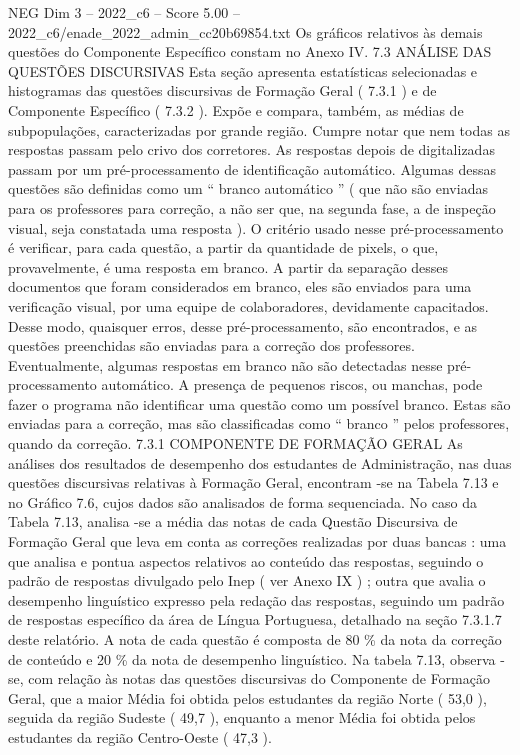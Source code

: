 \begin{textsample}{NEG Dim 3 – 2022\_c6 – Score 5.00 – 2022\_c6/enade\_2022\_admin\_cc20b69854.txt}
Os gráficos relativos às demais questões do Componente Específico constam no Anexo IV. 7.3 ANÁLISE DAS QUESTÕES DISCURSIVAS Esta seção apresenta estatísticas selecionadas e histogramas das questões discursivas de Formação Geral ( 7.3.1 ) e de Componente Específico ( 7.3.2 ).
Expõe e compara, também, as médias de subpopulações, caracterizadas por grande região.
Cumpre notar que nem todas as respostas passam pelo crivo dos corretores.
As respostas depois de digitalizadas passam por um pré-processamento de identificação automático.
Algumas dessas questões são definidas como um “ branco automático ” ( que não são enviadas para os professores para correção, a não ser que, na segunda fase, a de inspeção visual, seja constatada uma resposta ).
O critério usado nesse pré-processamento é verificar, para cada questão, a partir da quantidade de pixels, o que, provavelmente, é uma resposta em branco.
A partir da separação desses documentos que foram considerados em branco, eles são enviados para uma verificação visual, por uma equipe de colaboradores, devidamente capacitados.
Desse modo, quaisquer erros, desse pré-processamento, são encontrados, e as questões preenchidas são enviadas para a correção dos professores.
Eventualmente, algumas respostas em branco não são detectadas nesse pré-processamento automático.
A presença de pequenos riscos, ou manchas, pode fazer o programa não identificar uma questão como um possível branco.
Estas são enviadas para a correção, mas são classificadas como “ branco ” pelos professores, quando da correção. 7.3.1 COMPONENTE DE FORMAÇÃO GERAL As análises dos resultados de desempenho dos estudantes de Administração, nas duas questões discursivas relativas à Formação Geral, encontram -se na Tabela 7.13 e no Gráfico 7.6, cujos dados são analisados de forma sequenciada.
No caso da Tabela 7.13, analisa -se a média das notas de cada Questão Discursiva de Formação Geral que leva em conta as correções realizadas por duas bancas : uma que analisa e pontua aspectos relativos ao conteúdo das respostas, seguindo o padrão de respostas divulgado pelo Inep ( ver Anexo IX ) ; outra que avalia o desempenho linguístico expresso pela redação das respostas, seguindo um padrão de respostas específico da área de Língua Portuguesa, detalhado na seção 7.3.1.7 deste relatório.
A nota de cada questão é composta de 80 \% da nota da correção de conteúdo e 20 \% da nota de desempenho linguístico.
Na tabela 7.13, observa -se, com relação às notas das questões discursivas do Componente de Formação Geral, que a maior Média foi obtida pelos estudantes da região Norte ( 53,0 ), seguida da região Sudeste ( 49,7 ), enquanto a menor Média foi obtida pelos estudantes da região Centro-Oeste ( 47,3 ).

\end{textsample}
